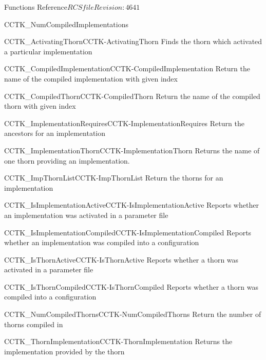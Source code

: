 \begin{cactuspart}{ Functions Reference}{$RCSfile$}{$Revision: 4641 $}
\begin{FunctionDescription}{CCTK\_NumCompiledImplementations}
\begin{SeeAlsoSection}
\begin{SeeAlso2}{CCTK\_ActivatingThorn}{CCTK-ActivatingThorn}
  Finds the thorn which activated a particular implementation
\end{SeeAlso2}
\begin{SeeAlso2}{CCTK\_CompiledImplementation}{CCTK-CompiledImplementation}
  Return the name of the compiled implementation with given index
\end{SeeAlso2}
\begin{SeeAlso2}{CCTK\_CompiledThorn}{CCTK-CompiledThorn}
  Return the name of the compiled thorn with given index
\end{SeeAlso2}
\begin{SeeAlso2}{CCTK\_ImplementationRequires}{CCTK-ImplementationRequires}
  Return the ancestors for an implementation
\end{SeeAlso2}
\begin{SeeAlso2}{CCTK\_ImplementationThorn}{CCTK-ImplementationThorn}
  Returns the name of one thorn providing an implementation.
\end{SeeAlso2}
\begin{SeeAlso2}{CCTK\_ImpThornList}{CCTK-ImpThornList}
  Return the thorns for an implementation
\end{SeeAlso2}
\begin{SeeAlso2}{CCTK\_IsImplementationActive}{CCTK-IsImplementationActive}
  Reports whether an implementation was activated in a parameter file
\end{SeeAlso2}
\begin{SeeAlso2}{CCTK\_IsImplementationCompiled}{CCTK-IsImplementationCompiled}
  Reports whether an implementation was compiled into a configuration
\end{SeeAlso2}
\begin{SeeAlso2}{CCTK\_IsThornActive}{CCTK-IsThornActive}
  Reports whether a thorn was activated in a parameter file
\end{SeeAlso2}
\begin{SeeAlso2}{CCTK\_IsThornCompiled}{CCTK-IsThornCompiled}
  Reports whether a thorn was compiled into a configuration
\end{SeeAlso2}
\begin{SeeAlso2}{CCTK\_NumCompiledThorns}{CCTK-NumCompiledThorns}
  Return the number of thorns compiled in
\end{SeeAlso2}
\begin{SeeAlso2}{CCTK\_ThornImplementation}{CCTK-ThornImplementation}
  Returns the implementation provided by the thorn
\end{SeeAlso2}
\end{SeeAlsoSection}


\end{FunctionDescription}
\end{cactuspart}
